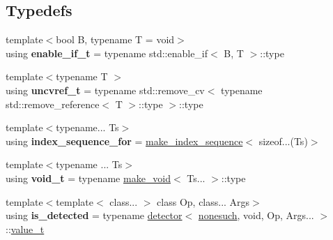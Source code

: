 \subsection*{Typedefs}
\begin{DoxyCompactItemize}
\item 
\mbox{\label{namespacenlohmann_1_1detail_a02bcbc878bee413f25b985ada771aa9c}} 
{\footnotesize template$<$bool B, typename T  = void$>$ }\\using {\bfseries enable\+\_\+if\+\_\+t} = typename std\+::enable\+\_\+if$<$ B, T $>$\+::type
\item 
\mbox{\label{namespacenlohmann_1_1detail_a53a082eedad9f4729fcd8fed552a21f7}} 
{\footnotesize template$<$typename T $>$ }\\using {\bfseries uncvref\+\_\+t} = typename std\+::remove\+\_\+cv$<$ typename std\+::remove\+\_\+reference$<$ T $>$\+::type $>$\+::type
\item 
\mbox{\label{namespacenlohmann_1_1detail_a24800493c6ec02ce033dcbb47b7fd28e}} 
{\footnotesize template$<$typename... Ts$>$ }\\using {\bfseries index\+\_\+sequence\+\_\+for} = \hyperlink{structnlohmann_1_1detail_1_1make__index__sequence}{make\+\_\+index\+\_\+sequence}$<$ sizeof...(Ts)$>$
\item 
\mbox{\label{namespacenlohmann_1_1detail_a92a167c49c6697b6ffe4f79492c705e5}} 
{\footnotesize template$<$typename ... Ts$>$ }\\using {\bfseries void\+\_\+t} = typename \hyperlink{structnlohmann_1_1detail_1_1make__void}{make\+\_\+void}$<$ Ts... $>$\+::type
\item 
\mbox{\label{namespacenlohmann_1_1detail_a9135fcf616d6ac6e231a86e0a055ac44}} 
{\footnotesize template$<$template$<$ class... $>$ class Op, class... Args$>$ }\\using {\bfseries is\+\_\+detected} = typename \hyperlink{structnlohmann_1_1detail_1_1detector}{detector}$<$ \hyperlink{structnlohmann_1_1detail_1_1nonesuch}{nonesuch}, void, Op, Args... $>$\+::\hyperlink{namespacenlohmann_1_1detail_a1ed8fc6239da25abcaf681d30ace4985}{value\+\_\+t}
\item 
\mbox{\label{namespacenlohmann_1_1detail_a37e97a32d0b94ce5f745427e4e40204d}} 

\end{DoxyCompactItemize}
